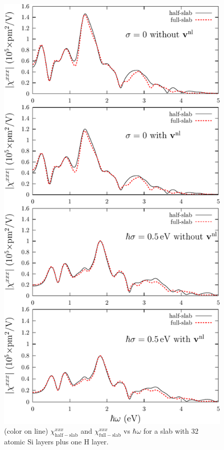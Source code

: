 \documentclass[floatfix,prb,aps,superscriptaddress,11pt,preprint,letterpaper]{revtex4}
\def\chon{black}
\begin{document}
\begin{figure}
\centering 
\includegraphics[scale=.8]{plots/fig2}
\caption{(color on line) 
$\chi^{xxx}_{\mathrm{half-slab}}$
and 
$\chi^{xxx}_{\mathrm{full-slab}}$
vs $\hbar\omega$ for a slab {\color{\chon} with} 32 
atomic Si layers plus one {\color{\chon} H layer}. 
\label{fig2}} 
\end{figure}
\end{document}
